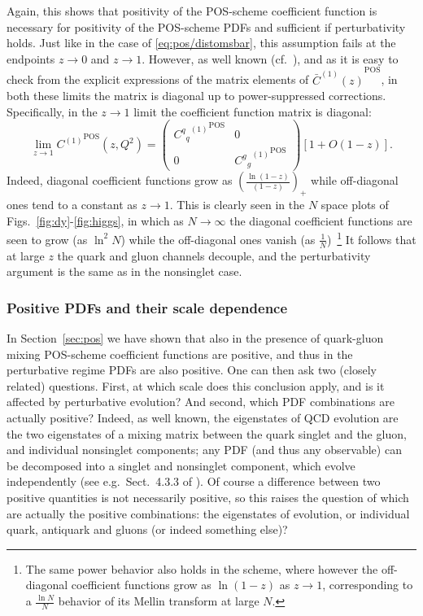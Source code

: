 Again, this shows that positivity of the POS-scheme  coefficient function is
necessary for positivity of the POS-scheme PDFs and sufficient if
perturbativity holds. Just like in the case of
\cref{eq:pos/distomsbar}, this assumption fails at the endpoints
$z\to0$ and $z\to 1$.
However, as well known (cf.\ \cite{Ellis:1991qj}), and as it is easy to check
from the explicit expressions of the matrix elements of ${\bar
C^{(1)}(z)}^{\textrm{POS}}$, in both these limits the matrix is diagonal up to
power-suppressed corrections.
Specifically, in the $z\to1$ limit the coefficient function matrix is
diagonal:
\begin{equation}\label{eq:pos/diag}
    \lim_{z\to 1}  {C^{(1)}}^{\textrm{POS}}(z,Q^2)=\left(\begin{array}{cc} {{{C^{q}}_q}^{(1)}}^{\textrm{POS}} &
      0 \\0 & {{{C^{g}}_g}^{(1)}}^{\textrm{POS}} \end{array}\right)\left[1+O(1-z)\right].
\end{equation}
Indeed, diagonal coefficient functions grow as
$\left(\frac{\ln(1-z)}{(1-z)}\right)_+$ while off-diagonal ones tend to a constant
as $z\to1$. This is clearly seen in the $N$ space plots of
Figs.~\ref{fig:dy}-\ref{fig:higgs}, in which as $N\to\infty$ the diagonal coefficient
functions are seen to grow (as $\ln^2N$) while the off-diagonal ones
vanish (as $\frac{1}{N}$)~\footnote{The same power behavior also
  holds in the \msbar{} scheme, where however the off-diagonal
  coefficient functions grow as $\ln(1-z)$ as $z\to 1$, corresponding
  to a $\frac{\ln N}{N}$ behavior of its Mellin transform at large $N$.}
It follows that at large $z$ the quark and gluon channels decouple, and
the perturbativity argument is the same as in the
nonsinglet case. 

\subsubsection{Positive PDFs and their scale dependence}
\label{sec:ap}


In Section~\ref{sec:pos}
we have shown that also in the presence of quark-gluon
mixing  POS-scheme
coefficient functions are positive, and thus in the perturbative
regime PDFs are also positive. One can then ask two (closely related)
questions. First, at which scale does this conclusion apply, and is it
affected by perturbative evolution? And second, which PDF combinations
are actually positive?
Indeed, as well known, the eigenstates of QCD evolution are the two
eigenstates of a mixing matrix between the quark singlet and the
gluon,  and individual nonsinglet components; any PDF (and thus any
observable) can be decomposed into a singlet and nonsinglet component,
which evolve independently (see
e.g.\ Sect.~4.3.3 of \cite{Ellis:1991qj}). Of course a difference
between two positive quantities is not necessarily positive, so this
raises the question of which are actually the positive combinations:
the eigenstates of evolution, or individual quark, antiquark and
gluons (or indeed something else)?


